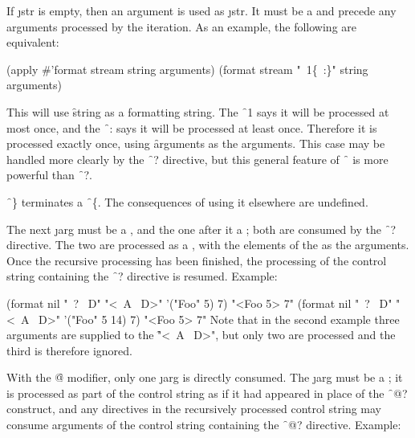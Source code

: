 If \j{str} is empty, then an argument is used as \j{str}.  
It must be a 
and precede any arguments processed by the iteration.  As an example,
the following are equivalent:

\code
    (apply #'format stream string arguments)
 \EQ (format stream "~1\{~:\}" string arguments)
\endcode

This will use \f{string} as a formatting string.  
The \f{~1\lbr } says it will                 
be processed at most once, and the \f{~:\rbr } 
says it will be processed at least once.
Therefore it is processed exactly once, using \f{arguments} as the arguments.
This case may be handled more clearly by the \f{~?} directive,
but this general feature of \f{~\lbr  }
is more powerful than \f{~?}.

\endsubsubsection%


                               
\f{~\}} terminates a \f{~\{}.
The consequences of using it elsewhere are undefined.

\endsubsubsection%




The next \j{arg} must be a , and the one after it a ;
both are consumed by the \f{~?} directive.
The two are processed as a , with the elements of the  
as the arguments.  Once the recursive processing
has been finished, the processing of the control
string containing the \f{~?} directive is resumed.
Example:

\code
 (format nil "~? ~D" "<~A ~D>" '("Foo" 5) 7) \EV "<Foo 5> 7"
 (format nil "~? ~D" "<~A ~D>" '("Foo" 5 14) 7) \EV "<Foo 5> 7"
\endcode
Note that in the second example three arguments are supplied
to the  \f{"<~A ~D>"}, but only two are processed
and the third is therefore ignored.

With the \f{@}
modifier, only one \j{arg} is directly consumed.
The \j{arg} must be a ; 
it is processed as part of the control
string as if it had appeared in place of the \f{~@?} construct,
and any directives in the recursively processed control string may      
consume arguments of the control string containing the \f{~@?}
directive.
Example:

